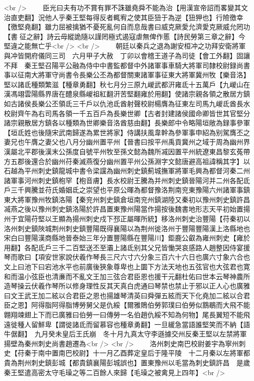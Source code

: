 <br />
　　臣光曰夫有功不賞有罪不誅雖堯舜不能為治【用漢宣帝詔而畧變其文治直吏翻】況他人乎秦王堅每得反者輒宥之使其臣狃于為逆【狃狎也】行險徼幸【徼堅堯翻】雖力屈被擒猶不憂死亂何自而息哉書曰威克厥愛允濟愛克厥威允罔功【書征之辭】詩云毋縱詭隨以謹罔極式遏寇虐無俾作慝【詩民勞第三章之辭】今堅違之能無亡乎<br />
<br />
　　朝廷以秦兵之退為謝安桓冲之功拜安衛將軍與冲皆開府儀同三司　六月甲子大赦　丁卯以會稽王道子為司徒【會工外翻】固讓不拜　秦王堅召陽平公融為侍中中書監都督中外諸軍事車騎大將軍司隸校尉録尚書事以征南大將軍守尚書令長樂公丕為都督關東諸軍事征東大將軍冀州牧【樂音洛】堅以諸氐種類繁滋【種章勇翻】秋七月分三原九嵕武都汧雍氐十五萬戶【九嵕山在漢馮翊雲陽縣界唐在醴泉縣嵕祖紅翻汧苦堅翻雍於用翻】使諸宗親各領之散居方鎮如古諸侯長樂公丕領氐三千戶以仇池氐酋射聲校尉楊膺為征東左司馬九嵕氐酋長水校尉齊午為右司馬各領一千五百戶為長樂世卿【古者封建諸侯國命卿皆世其官堅分諸宗親散居方鎮各以種類為世卿樂音洛酋慈由翻】長樂郎中令略陽垣敞為録事參軍【垣氐姓也後隨宋武南歸遂為累世將家】侍講扶風韋幹為參軍事申紹為别駕膺丕之妻兄也午膺之妻父也八月分幽州置平州【晉書曰按平州禹貢冀州之域于周為幽州界漢屬北平郡後漢末公孫度自號平州牧至孫文懿為魏所㓕因置平州統遼東昌黎玄菟帶方五郡後還合於幽州苻秦滅燕復分幽州置平州公孫淵字文懿唐避高祖諱稱其字】以石越為平州刺史鎮龍城中書令梁讜為幽州刺史鎮薊城撫軍將軍毛興為都督河秦二州諸軍事河州刺史鎮枹罕【枹音膚】長水校尉王騰為并州刺史鎮晉陽河并二州各配氐戶三千興騰並苻氏婚姻氐之崇望也平原公暉為都督豫洛荆南兖東豫陽六州諸軍事鎮東大將軍豫州牧鎮洛陽【秦兖州刺史鎮倉垣南兖州鎮湖陸又秦初以豫州刺史鎮許昌㓕燕之後以豫州刺史鎮洛陽於許昌置東豫州陽當作揚按後魏書地形志天平初始置揚州于宜陽苻堅以王顯為揚州刺史戍下邳正屬暉所統】移洛州刺史治豐陽【苻秦初以洛州刺史鎮陜城荆州刺史鎮豐陽既得襄陽以為荆州徙洛州于豐陽豐陽漢上洛縣地也宋白曰豐陽漢商縣地晉泰始三年分置豐陽縣在豐陽川】鉅鹿公叡為雍州刺史【雍於用翻】各配氐戶三千二百堅送丕至灞上諸氐别其父兄皆慟哭哀感路人趙整因侍宴援琴而歌曰【項安世家說伏羲作琴長三尺六寸六分象三百六十六日也廣六寸象六合也文上曰池下曰宕池水平也前廣後狹象尊卑也上圜下方法天地也五弦官也大弦君也寛和而温小弦臣也清亷而不亂文王加三弦合君臣恩也援干元翻杜佑曰世本云琴神農所造琴操云伏羲作琴所以修身理性反其天真白虎通曰琴禁也禁止于邪以正人心也廣雅曰文王武王加二絃以合君臣之恩也揚雄琴清英曰舜彈五絃而天下化堯加二絃以合君臣之恩】阿得脂阿得脂博勞舅父是仇綏【爾雅鵙伯勞郭璞曰伯勞似鶷鶡而大飛不能翺翔竦翅上下而已廣雅曰伯勞一曰傳勞一名伯趙仇綏不知為何物】尾長翼短不能飛遠徙種人留鮮卑【謂徙諸氐而留慕容也種章勇翻】一旦緩急當語誰堅笑而不納【語牛倨翻】　九月癸未皇后王氏崩　冬十月九真太守李遜據交州反秦王堅以左禁將軍揚壁為秦州刺史尚書趙遷為<br />
<br />
　　洛州刺史南巴校尉姜宇為寧州刺史【苻秦于南中置南巴校尉】十一月乙酉葬定皇后于隆平陵　十二月秦以左將軍都貴為荆州刺史鎮彭城【都貴鎮襄陽彭城誤也】置東豫州以毛當為刺史鎮許昌　是歲秦王堅遣高密太守毛璪之等二百餘人來歸【毛璪之被禽見上四年】<br />
